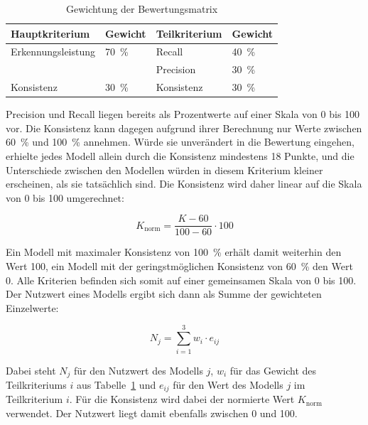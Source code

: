\begin{table}[h]
    \centering
    \begin{tabular}{llll}
        \hline
        Hauptkriterium & Gewicht & Teilkriterium & Gewicht \\
        \hline
        Erkennungsleistung & 70~\% & Recall & 40~\% \\
                           &        & Precision & 30~\% \\
        Konsistenz         & 30~\% & Konsistenz & 30~\% \\
        \hline
    \end{tabular}
    \caption{Gewichtung der Bewertungsmatrix}
    \label{tab:gewichtung}
\end{table}

Precision und Recall liegen bereits als Prozentwerte auf einer Skala von 0 bis 100 vor. Die Konsistenz kann dagegen aufgrund ihrer Berechnung nur Werte zwischen 60~\% und 100~\% annehmen. Würde sie unverändert in die Bewertung eingehen, erhielte jedes Modell allein durch die Konsistenz mindestens 18 Punkte, und die Unterschiede zwischen den Modellen würden in diesem Kriterium kleiner erscheinen, als sie tatsächlich sind. Die Konsistenz wird daher linear auf die Skala von 0 bis 100 umgerechnet:

\begin{equation}
    K_{\text{norm}} = \frac{K - 60}{100 - 60} \cdot 100
\end{equation}

Ein Modell mit maximaler Konsistenz von 100~\% erhält damit weiterhin den Wert 100, ein Modell mit der geringstmöglichen Konsistenz von 60~\% den Wert 0. Alle Kriterien befinden sich somit auf einer gemeinsamen Skala von 0 bis 100. Der Nutzwert eines Modells ergibt sich dann als Summe der gewichteten Einzelwerte:

\begin{equation}
    N_j = \sum_{i=1}^{3} w_i \cdot e_{ij}
\end{equation}

Dabei steht $N_j$ für den Nutzwert des Modells $j$, $w_i$ für das Gewicht des Teilkriteriums $i$ aus Tabelle~\ref{tab:gewichtung} und $e_{ij}$ für den Wert des Modells $j$ im Teilkriterium $i$. Für die Konsistenz wird dabei der normierte Wert $K_{\text{norm}}$ verwendet. Der Nutzwert liegt damit ebenfalls zwischen 0 und 100.

